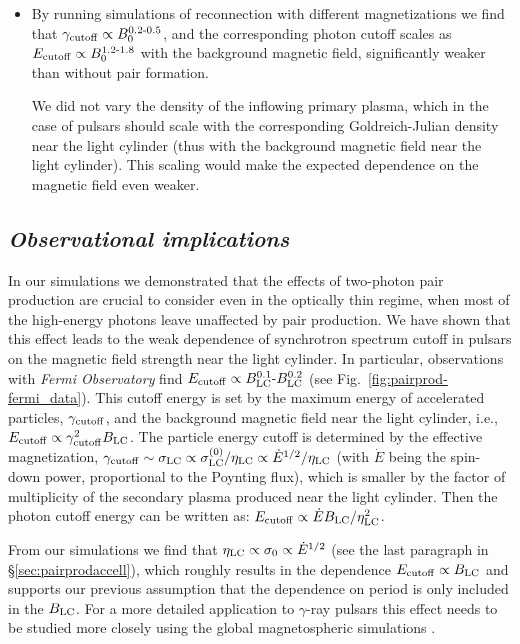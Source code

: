\begin{itemize}[leftmargin=*,wide = 0pt]
    \item By running simulations of reconnection with different magnetizations we find that $\gamma_{\rm cutoff}\propto B_0^{0.2\text{-}0.5}$, and the corresponding photon cutoff scales as $E_{\rm cutoff}\propto B_0^{1.2\text{-}1.8}$ with the background magnetic field, significantly weaker than without pair formation.

    We did not vary the density of the inflowing primary plasma, which in the case of pulsars should scale with the corresponding Goldreich-Julian density near the light cylinder (thus with the background magnetic field near the light cylinder). This scaling would make the expected dependence on the magnetic field even weaker.
\end{itemize}

\subsection*{\small \it Observational implications}

In our simulations we demonstrated that the effects of two-photon pair production are crucial to consider even in the optically thin regime, when most of the high-energy photons leave unaffected by pair production. We have shown that this effect leads to the weak dependence of synchrotron spectrum cutoff in pulsars on the magnetic field strength near the light cylinder. In particular, observations with {\it Fermi Observatory} find $E_{\rm cutoff}\propto B_{\rm LC}^{0.1}\text{-}B_{\rm LC}^{0.2}$ (see Fig.~\ref{fig:pairprod-fermi_data}). This cutoff energy is set by the maximum energy of accelerated particles, $\gamma_{\rm cutoff}$, and the background magnetic field near the light cylinder, i.e., $E_{\rm cutoff}\propto \gamma_{\rm cutoff}^2 B_{\rm LC}$. The particle energy cutoff is determined by the effective magnetization, $\gamma_{\rm cutoff}\sim \sigma_{\rm LC}\propto\sigma^{(0)}_{\rm LC}/\eta_{\rm LC}\propto \dot{E}^{1/2} / \eta_{\rm LC}$ (with $\dot{E}$ being the spin-down power, proportional to the Poynting flux), which is smaller by the factor of multiplicity of the secondary plasma produced near the light cylinder. Then the photon cutoff energy can be written as: $E_{\rm cutoff}\propto \dot{E}B_{\rm LC}/\eta_{\rm LC}^2$. \par

From our simulations we find that $\eta_{\rm LC}\propto \sigma_0\propto \dot{E}^{1/2}$ (see the last paragraph in \S\ref{sec:pairprodaccell}), which roughly results in the dependence $E_{\rm cutoff}\propto B_{\rm LC}$ and supports our previous assumption that the dependence on period is only included in the $B_{\rm LC}$. For a more detailed application to $\gamma$-ray pulsars this effect needs to be studied more closely using the global magnetospheric simulations \citep{PSAS18}. \par

